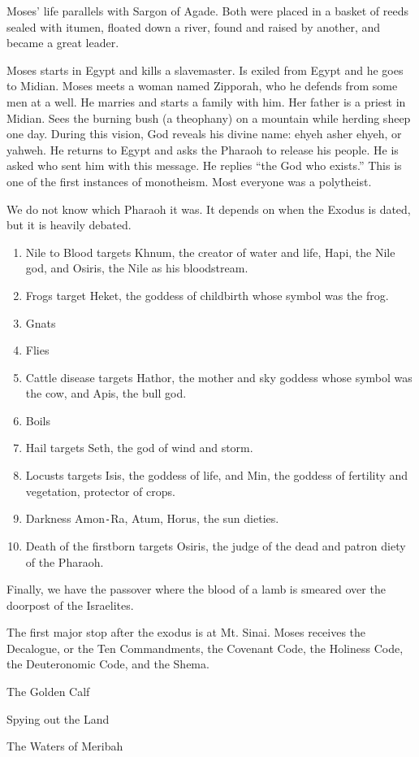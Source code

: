 \documentclass{article}
\begin{document}
    Moses' life parallels with Sargon of Agade. Both were placed in a basket of reeds sealed with itumen, floated down a river, found and raised by another, and became a great leader.

    Moses starts in Egypt and kills a slavemaster. Is exiled from Egypt and he goes to Midian. Moses meets a woman named Zipporah, who he defends from some men at a well. He marries and starts a family with him. Her father is a priest in Midian. Sees the burning bush (a theophany) on a mountain while herding sheep one day. During this vision, God reveals his divine name: ehyeh asher ehyeh, or yahweh. He returns to Egypt and asks the Pharaoh to release his people. He is asked who sent
    him with this message. He replies ``the God who exists.'' This is one of the first instances of monotheism. Most everyone was a polytheist.

    We do not know which Pharaoh it was. It depends on when the Exodus is dated, but it is heavily debated.

    \begin{enumerate}
        \item Nile to Blood targets Khnum, the creator of water and life, Hapi, the Nile god, and Osiris, the Nile as his bloodstream.
        \item Frogs target Heket, the goddess of childbirth whose symbol was the frog.
        \item Gnats
        \item Flies
        \item Cattle disease targets Hathor, the mother and sky goddess whose symbol was the cow, and Apis, the bull god.
        \item Boils
        \item Hail targets Seth, the god of wind and storm.
        \item Locusts targets Isis, the goddess of life, and Min, the goddess of fertility and vegetation, protector of crops.
        \item Darkness Amon\texttt{-}Ra, Atum, Horus, the sun dieties.
        \item Death of the firstborn targets Osiris, the judge of the dead and patron diety of the Pharaoh.
    \end{enumerate}

    Finally, we have the passover where the blood of a lamb is smeared over the doorpost of the Israelites.

    The first major stop after the exodus is at Mt. Sinai. Moses receives the Decalogue, or the Ten Commandments, the Covenant Code, the Holiness Code, the Deuteronomic Code, and the Shema.

    The Golden Calf

    Spying out the Land

    The Waters of Meribah
\end{document}
